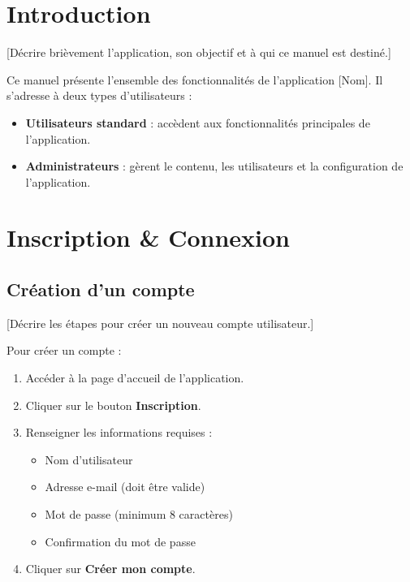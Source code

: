 \documentclass[12pt, a4paper]{article}
\begin{document}
\makecoverpage
\makesommaire

\section{Introduction}

[Décrire brièvement l'application, son objectif et à qui ce manuel est destiné.]

Ce manuel présente l'ensemble des fonctionnalités de l'application [Nom].
Il s'adresse à deux types d'utilisateurs :
\begin{itemize}
  \item \textbf{Utilisateurs standard} : accèdent aux fonctionnalités
    principales de l'application.
  \item \textbf{Administrateurs} : gèrent le contenu, les utilisateurs et
    la configuration de l'application.
\end{itemize}

\section{Inscription \& Connexion}

\subsection{Création d'un compte}

[Décrire les étapes pour créer un nouveau compte utilisateur.]

Pour créer un compte :
\begin{enumerate}
  \item Accéder à la page d'accueil de l'application.
  \item Cliquer sur le bouton \textbf{Inscription}.
  \item Renseigner les informations requises :
    \begin{itemize}
      \item Nom d'utilisateur
      \item Adresse e-mail (doit être valide)
      \item Mot de passe (minimum 8 caractères)
      \item Confirmation du mot de passe
    \end{itemize}
  \item Cliquer sur \textbf{Créer mon compte}.
\end{enumerate}
\end{document}
